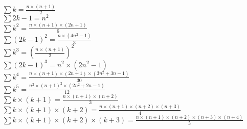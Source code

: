 $\sum{k} = \frac{n\times (n+1)}{2}$\\
$\sum{2k-1} = n^{2}$\\
$\sum{k^{2}} = \frac{n\times (n+1)\times (2n+1)}{6}$\\
$\sum{(2k-1)^{2}} = \frac{n\times (4n^{2}-1)}{3}$\\
$\sum{k^{3}} = (\frac{n\times (n+1)}{2})^{2}$\\
$\sum{(2k-1)^{3}} = n^{2}\times (2n^{2}-1)$\\
$\sum{k^{4}} = \frac{n\times (n+1)\times (2n+1)\times (3n^{2}+3n-1)}{30}$\\
$\sum{k^{5}} = \frac{n^{2}\times (n+1)^{2}\times (2n^{2}+2n-1)}{12}$\\
$\sum{k\times (k+1)} = \frac{n\times (n+1)\times (n+2)}{3}$\\
$\sum{k\times (k+1)\times (k+2)} = \frac{n\times (n+1)\times (n+2)\times (n+3)}{4}$\\
$\sum{k\times (k+1)\times (k+2)\times (k+3)} = \frac{n\times (n+1)\times (n+2)\times (n+3)\times (n+4)}{5}$\\
